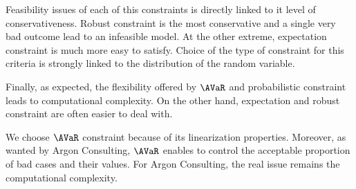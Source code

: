 Feasibility issues of each of this constraints is directly linked to it level of conservativeness.
Robust constraint is the most conservative and a single very bad outcome lead to an infeasible model.
At the other extreme, expectation constraint is much more easy to satisfy.
Choice of the type of constraint for this criteria is strongly linked to the distribution of the random variable.


Finally, as expected, the flexibility offered by $\AVaR$ and probabilistic constraint leads to computational complexity.
On the other hand, expectation and robust constraint are often easier to deal with.


\medskip


We choose $\AVaR$ constraint because of its linearization properties.
Moreover, as wanted by Argon Consulting, $\AVaR$ enables to control the acceptable proportion of bad cases and their values.
For Argon Consulting, the real issue remains the computational complexity.

